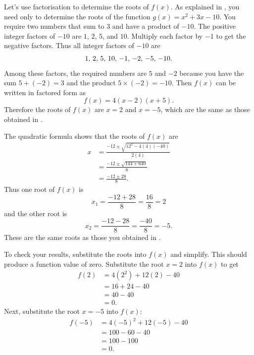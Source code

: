 \documentclass[a4paper,oneside,12pt]{article}
\begin{document}
{\begin{solution}
Let's use factorisation to determine the roots of $f(x)$.  As
explained in , you
need only to determine the roots of the function
$g(x) = x^2 + 3x - 10$.  You require two numbers that sum to $3$ and
have a product of $-10$.  The positive integer factors of $-10$ are
$1$, $2$, $5$, and $10$.  Multiply each factor by $-1$ to get the
negative factors.  Thus all integer factors of $-10$ are
\[
{1},\, {2},\, {5},\, {10},\, {-1},\, {-2},\, {-5},\, {-10}.
\]
Among these factors, the required numbers are $5$ and $-2$ because you
have the sum $5 + (-2) = 3$ and the product $5 \times (-2) = -10$.
Then $f(x)$ can be written in factored form as
\[
f(x)
=
4(x - 2) (x + 5).
\]
Therefore the roots of $f(x)$ are $x = 2$ and $x = -5$, which are the
same as those obtained
in .

The quadratic formula shows that the roots of $f(x)$ are
\begin{align*}
x
&=
\frac{
  -12
  \pm
  \sqrt{
    12^2 - 4(4)(-40)
  }
}{
  2(4)
} \\[4pt]
&=
\frac{
  -12
  \pm
  \sqrt{144 + 640}
}{
  8
} \\[4pt]
&=
\frac{
  -12 \pm 28
}{
  8
}.
\end{align*}
Thus one root of $f(x)$ is
\[
x_1
=
\frac{-12 + 28}{8}
=
\frac{16}{8}
=
2
\]
and the other root is
\[
x_2
=
\frac{-12 - 28}{8}
=
\frac{-40}{8}
=
-5.
\]
These are the same roots as those you obtained
in .

To check your results, substitute the roots into $f(x)$ and simplify.
This should produce a function value of zero.  Substitute the root
$x = 2$ into $f(x)$ to get
\begin{align*}
f(2)
&=
4(2^2) + 12(2) - 40 \\[4pt]
&=
16 + 24 - 40 \\[4pt]
&=
40 - 40 \\[4pt]
&=
0.
\end{align*}
Next, substitute the root $x = -5$ into $f(x)$:
\begin{align*}
f(-5)
&=
4(-5)^2 + 12(-5) - 40 \\[4pt]
&=
100 - 60 - 40 \\[4pt]
&=
100 - 100 \\[4pt]
&=
0.
\end{align*}
\end{solution}
}{}
\end{document}
